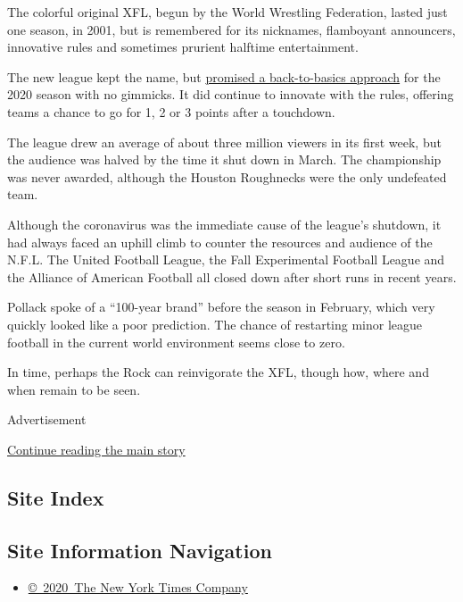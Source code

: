 The colorful original XFL, begun by the World Wrestling Federation,
lasted just one season, in 2001, but is remembered for its nicknames,
flamboyant announcers, innovative rules and sometimes prurient halftime
entertainment.

The new league kept the name, but
\href{https://www.nytimes3xbfgragh.onion/2020/02/05/sports/football/xfl-preview.html}{promised
a back-to-basics approach} for the 2020 season with no gimmicks. It did
continue to innovate with the rules, offering teams a chance to go for
1, 2 or 3 points after a touchdown.

The league drew an average of about three million viewers in its first
week, but the audience was halved by the time it shut down in March. The
championship was never awarded, although the Houston Roughnecks were the
only undefeated team.

Although the coronavirus was the immediate cause of the league's
shutdown, it had always faced an uphill climb to counter the resources
and audience of the N.F.L. The United Football League, the Fall
Experimental Football League and the Alliance of American Football all
closed down after short runs in recent years.

Pollack spoke of a ``100-year brand'' before the season in February,
which very quickly looked like a poor prediction. The chance of
restarting minor league football in the current world environment seems
close to zero.

In time, perhaps the Rock can reinvigorate the XFL, though how, where
and when remain to be seen.

Advertisement

\protect\hyperlink{after-bottom}{Continue reading the main story}

\hypertarget{site-index}{%
\subsection{Site Index}\label{site-index}}

\hypertarget{site-information-navigation}{%
\subsection{Site Information
Navigation}\label{site-information-navigation}}

\begin{itemize}
\tightlist
\item
  \href{https://help.nytimes3xbfgragh.onion/hc/en-us/articles/115014792127-Copyright-notice}{©~2020~The
  New York Times Company}
\end{itemize}


